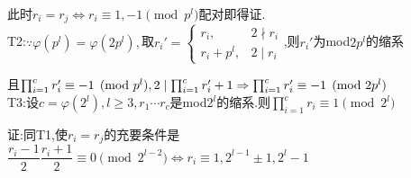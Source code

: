此时$ r_i=r_j\Leftrightarrow r_i\equiv 1,-1\pmod{p^l}$配对即得证.
\\

T2:$ \because \varphi(p^l)=\varphi(2p^l),$取$ r_i'= \begin{cases}r_i,& 2 \nmid r_i\\ r_i+p^l,& 2\mid r_i\end{cases} $,则$ r_i'$为mod$ 2p^l$的缩系

且$ \prod_{i=1}^{c}{r_i'}\equiv -1 \pmod{p^l},2 \mid  \prod_{i=1}^{c}{r_i'}+1\Rightarrow  \prod_{i=1}^{c}{r_i'}\equiv -1 \pmod{2p^l}\\$
\\

T3:设$ c=\varphi(2^l),l\ge 3,r_1\cdots r_c$是mod$ 2^l$的缩系.则$  \prod_{i=1}^{c}{r_i}\equiv 1 \pmod{2^l}$

证:同T1,使$ r_i=r_j$的充要条件是$ \dfrac{r_i-1}{2}\dfrac{r_i+1}{2}\equiv 0 \pmod{2^{l-2}}\Leftrightarrow r_i\equiv 1,2^{l-1}\pm 1,2^l-1$
